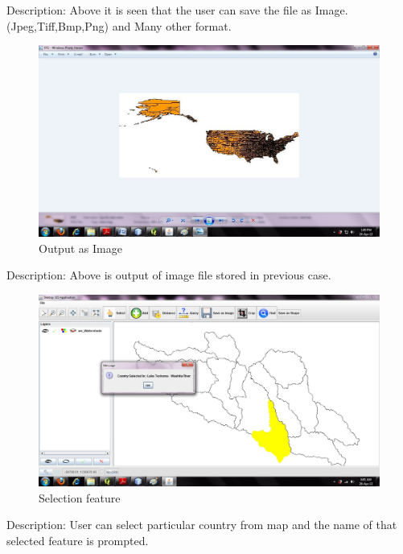 Description: Above it is seen that the user can save the file as Image.(Jpeg,Tiff,Bmp,Png) and Many other format.
\newpage


\begin{figure}[h]
\begin{center}
  \includegraphics[scale=0.43] {11.jpg}
  \caption[Screenshot - Output Image]{Output as Image}
\end{center}
\end{figure}
Description: Above is output of image file stored in previous case.

\newpage
\begin{figure}[h]
\begin{center}
  \includegraphics[scale=0.43] {12.jpg}
  \caption[Screenshot - Selection]{Selection feature}
\end{center}
\end{figure}
Description: User can select particular country from map and the name of that selected feature is prompted.
\newpage




